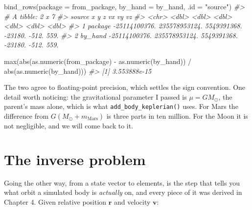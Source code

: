\documentclass[
  10.5pt,
  letterpaper,
]{scrbook}
\newenvironment{Shaded}{\begin{snugshade}}{\end{snugshade}}
\newcommand{\AttributeTok}[1]{\textcolor[rgb]{0.00,0.00,0.00}{#1}}
\newcommand{\CommentTok}[1]{\textcolor[rgb]{0.00,0.00,0.00}{\textit{#1}}}
\newcommand{\FunctionTok}[1]{\textcolor[rgb]{0.00,0.00,0.00}{#1}}
\newcommand{\NormalTok}[1]{\textcolor[rgb]{0.00,0.00,0.00}{#1}}
\newcommand{\SpecialCharTok}[1]{\textcolor[rgb]{0.00,0.00,0.00}{#1}}
\newcommand{\StringTok}[1]{\textcolor[rgb]{0.00,0.00,0.00}{#1}}
\theoremstyle{definition}
\theoremstyle{plain}
\theoremstyle{remark}
\begin{document}
\begin{Shaded}
\begin{Highlighting}[]
\FunctionTok{bind\_rows}\NormalTok{(}\AttributeTok{package =}\NormalTok{ from\_package, }\AttributeTok{by\_hand =}\NormalTok{ by\_hand, }\AttributeTok{.id =} \StringTok{"source"}\NormalTok{)}
\CommentTok{\#\textgreater{} \# A tibble: 2 x 7}
\CommentTok{\#\textgreater{}   source              x             y           z      vx    vy    vz}
\CommentTok{\#\textgreater{}   \textless{}chr\textgreater{}           \textless{}dbl\textgreater{}         \textless{}dbl\textgreater{}       \textless{}dbl\textgreater{}   \textless{}dbl\textgreater{} \textless{}dbl\textgreater{} \textless{}dbl\textgreater{}}
\CommentTok{\#\textgreater{} 1 package {-}25114100376. 235578953124. 5549391368. {-}23180. {-}512.  559.}
\CommentTok{\#\textgreater{} 2 by\_hand {-}25114100376. 235578953124. 5549391368. {-}23180. {-}512.  559.}
\end{Highlighting}
\end{Shaded}

\begin{Shaded}
\begin{Highlighting}[]
\FunctionTok{max}\NormalTok{(}\FunctionTok{abs}\NormalTok{(}\FunctionTok{as.numeric}\NormalTok{(from\_package) }\SpecialCharTok{{-}} \FunctionTok{as.numeric}\NormalTok{(by\_hand)) }\SpecialCharTok{/}
      \FunctionTok{abs}\NormalTok{(}\FunctionTok{as.numeric}\NormalTok{(by\_hand)))}
\CommentTok{\#\textgreater{} [1] 3.553888e{-}15}
\end{Highlighting}
\end{Shaded}

The two agree to floating-point precision, which settles the sign
convention. One detail worth noticing: the gravitational parameter I
passed is \(\mu = GM_{\odot}\), the parent's mass alone, which is what
\texttt{add\_body\_keplerian()} uses. For Mars the difference from
\(G(M_\odot + m_{\mathrm{Mars}})\) is three parts in ten million. For
the Moon it is not negligible, and we will come back to it.

\section{The inverse problem}\label{the-inverse-problem}

Going the other way, from a state vector to elements, is the step that
tells you what orbit a simulated body is \emph{actually} on, and every
piece of it was derived in Chapter 4. Given relative position
\(\mathbf{r}\) and velocity \(\mathbf{v}\):
\end{document}
